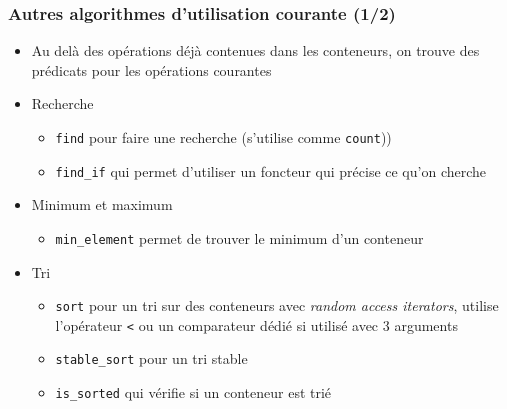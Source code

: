 \begin{frame}[fragile]\frametitle{Autres algorithmes d'utilisation courante (1/2)}
\begin{itemize}
\item Au delà des opérations déjà contenues dans les conteneurs, on trouve des prédicats pour les opérations courantes
\item Recherche
\begin{itemize}
\item \texttt{find}  pour faire une recherche (s'utilise comme \texttt{count}))
\item \verb|find_if|  qui permet d'utiliser un foncteur qui précise ce qu'on cherche
\end{itemize}
\item Minimum et maximum
\begin{itemize}
\item \verb|min_element|  permet de trouver le minimum d'un conteneur
\end{itemize}
\item Tri
\begin{itemize}
\item \verb|sort|  pour un tri sur des conteneurs avec \textit{random access iterators}, utilise l'opérateur \verb|<| ou un comparateur dédié si utilisé avec 3 arguments
\item \verb|stable_sort|  pour un tri stable
\item \verb|is_sorted|  qui vérifie si un conteneur est trié
\end{itemize}
\end{itemize}
\end{frame}

